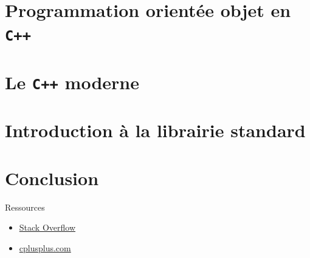 \documentclass{beamer}
\numberwithin{equation}{section}
\begin{document}
\section{Programmation orientée objet en \texttt{C++}}
\label{sec:poo}



\section{Le \texttt{C++} moderne}
\label{sec:cpp-moderne}



\section{Introduction à la librairie standard}


\section*{Conclusion}
\label{sec:conclusion}
\begin{frame}{Ressources}
  \begin{itemize}
    \item \href{https://stackoverflow.com/}{Stack Overflow}
    \item \href{http://www.cplusplus.com/}{cplusplus.com}
  \end{itemize}
\end{frame}
\end{document}
